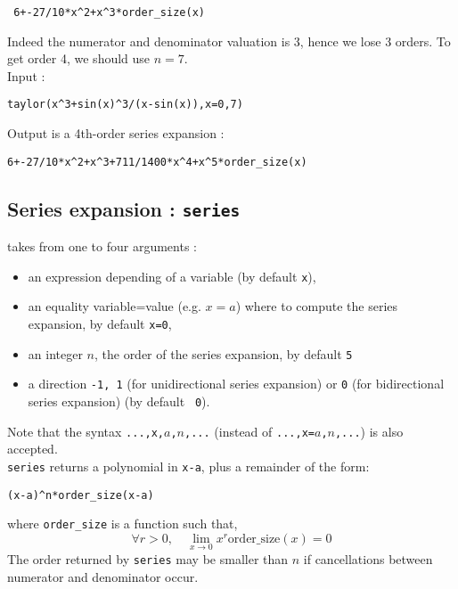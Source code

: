 \documentclass[a4paper,11pt]{book}
\begin{document}
\begin{center}{\tt
    6+-27/10*x\verb|^2|+x\verb|^|3*order\_size(x)}\end{center}
Indeed the numerator and denominator valuation is 3, hence we lose 3
orders. To get order 4, we should use $n=7$.\\
Input :
\begin{center}{\tt taylor(x\verb|^|3+sin(x)\verb|^|3/(x-sin(x)),x=0,7)}\end{center}
Output is a 4th-order series expansion :
\begin{center}{\tt 6+-27/10*x\verb|^|2+x\verb|^|3+711/1400*x\verb|^|4+x\verb|^|5*order\_size(x)}\end{center}

\subsection{Series expansion : {\tt series}} 
 takes from one to four arguments :
\begin{itemize}
\item an expression depending of a variable (by default {\tt x}),
\item an equality variable=value (e.g. $x=a$) where to compute
the series expansion, by default {\tt x=0}, 
\item an integer $n$, the order of the series expansion,
by default {\tt 5}
\item a direction  {\tt -1, 1} (for unidirectional series expansion)
  or {\tt 0} (for bidirectional series expansion) (by default {\tt
    0}).
\end{itemize}
Note that the syntax {\tt ...,x,$a$,$n$,...} 
(instead of {\tt ...,x=$a$,$n$,...}) is also accepted.\\
{\tt series} returns  a polynomial in {\tt x-a}, plus a remainder 
of the form:
\begin{center}
 {\tt (x-a)\verb|^|n*order\_size(x-a)}
\end{center}
where {\tt order\_size} is a function such that,
\[ \forall r>0, \quad \lim_{x\rightarrow 0} x^r \mbox{order\_size}(x) = 0 \]
The order returned by {\tt series} may be smaller than $n$ if
cancellations between numerator and denominator occur.
\end{document}
